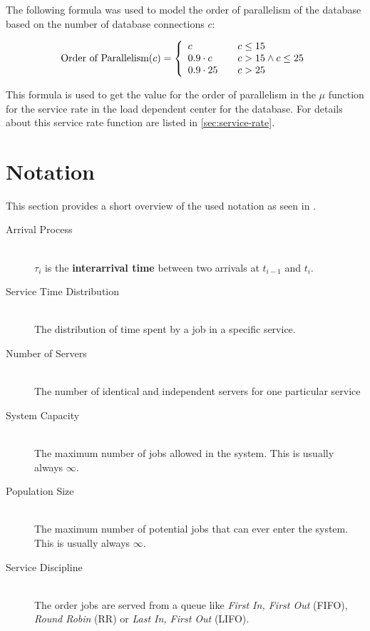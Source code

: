 \documentclass[a4paper, oneside]{csthesis}
\begin{document}
    The following formula was used to model the order of parallelism of the
    database based on the number of database connections $c$:
    
    \[ 
    \text{Order of Parallelism}(c) = \left\{ 
      \begin{array}{l l}
        c                   & \quad c \leq 15               \\
        0.9 \cdot c         & \quad c > 15 \land c \leq 25   \\
        0.9 \cdot 25        & \quad c > 25
      \end{array} \right.
    \]
        
    This formula is used to get the value for the order of parallelism in the
    $\mu$ function for the service rate in the load dependent center for the
    database.
    For details about this service rate function are
    listed in \cref{sec:service-rate}.
    
\section{Notation}

    This section provides a short overview of the used notation as seen in
    \cite{jain2008art}.

    \begin{description}
    \item[Arrival Process] \ \\ 
      $\tau_i$ is the {\bf interarrival time} between two arrivals at $t_{i-1}$
      and $t_{i}$.
    \item[Service Time Distribution] \ \\
      The distribution of time spent by a job in a specific service.
    \item[Number of Servers] \ \\
      The number of identical and independent servers for one particular service
    \item[System Capacity] \ \\
      The maximum number of jobs allowed in the system. This is usually always
      $\infty$.
    \item[Population Size] \ \\
      The maximum number of potential jobs that can ever enter the system. This
      is usually always $\infty$.
    \item[Service Discipline] \ \\
      The order jobs are served from a queue like {\it First In, First Out}
      (FIFO), {\it Round Robin} (RR) or {\it Last In, First Out} (LIFO).
    \end{description}
\end{document}
